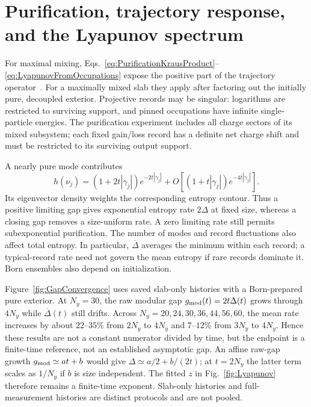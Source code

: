 \documentclass[aps,prb,10pt,twocolumn,superscriptaddress,longbibliography,floatfix]{revtex4-2}
\newcommand{\newtext}[1]{{\color{blue}#1}}
\begin{document}
\section{\newtext{Purification, trajectory response, and the Lyapunov spectrum}}
\label{app:Lyapunov}
{\color{blue}
For maximal mixing, Eqs.~\eqref{eq:PurificationKrausProduct}--\eqref{eq:LyapunovFromOccupations} expose the positive part of the trajectory operator~\cite{XiaoKawabata2026}. For a maximally mixed slab they apply after factoring out the initially pure, decoupled exterior. Projective records may be singular: logarithms are restricted to surviving support, and pinned occupations have infinite single-particle energies. The purification experiment includes all charge sectors of its mixed subsystem; each fixed gain/loss record has a definite net charge shift and must be restricted to its surviving output support.

A nearly pure mode contributes
\begin{equation}
 h(\nu_j)=(1+2t|\gamma_j|)e^{-2t|\gamma_j|}
 +O\!\left[(1+t|\gamma_j|)e^{-4t|\gamma_j|}\right].
 \label{eq:PurificationEntropyAsymptotic}
\end{equation}
Its eigenvector density weights the corresponding entropy contour. Thus a positive limiting gap gives exponential entropy rate $2\Delta$ at fixed size, whereas a closing gap removes a size-uniform rate. A zero limiting rate still permits subexponential purification. The number of modes and record fluctuations also affect total entropy. In particular, $\overline\Delta$ averages the minimum within each record; a typical-record rate need not govern the mean entropy if rare records dominate it. Born ensembles also depend on initialization.

Figure~\ref{fig:GapConvergence} uses saved slab-only histories with a Born-prepared pure exterior. At $N_y=30$, the raw modular gap $g_{\rm mod}(t)=2t\Delta(t)$ grows through $4N_y$ while $\overline\Delta(t)$ still drifts. Across $N_y=20,24,30,36,44,56,60$, the mean rate increases by about $22$--$35\%$ from $2N_y$ to $4N_y$ and $7$--$12\%$ from $3N_y$ to $4N_y$. Hence these results are not a constant numerator divided by time, but the endpoint is a finite-time reference, not an established asymptotic gap. An affine raw-gap growth $g_{\rm mod}\simeq at+b$ would give $\Delta\simeq a/2+b/(2t)$; at $t=2N_y$ the latter term scales as $1/N_y$ if $b$ is size independent. The fitted $z$ in Fig.~\ref{fig:Lyapunov} therefore remains a finite-time exponent. Slab-only histories and full-measurement histories are distinct protocols and are not pooled.

}
\end{document}
